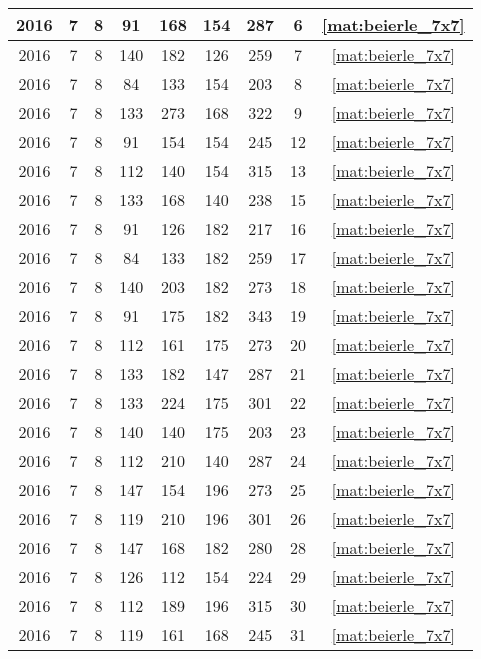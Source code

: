 \begin{longtable}{|c|c|c|c|c|c|c|c|c|}
2016 & 7 & 8 & 91 & 168 & 154 & 287 & 6 & \eqref{mat:beierle_7x7} \\ \hline 
2016 & 7 & 8 & 140 & 182 & 126 & 259 & 7 & \eqref{mat:beierle_7x7} \\ \hline 
2016 & 7 & 8 & 84 & 133 & 154 & 203 & 8 & \eqref{mat:beierle_7x7} \\ \hline 
2016 & 7 & 8 & 133 & 273 & 168 & 322 & 9 & \eqref{mat:beierle_7x7} \\ \hline 
2016 & 7 & 8 & 91 & 154 & 154 & 245 & 12 & \eqref{mat:beierle_7x7} \\ \hline 
2016 & 7 & 8 & 112 & 140 & 154 & 315 & 13 & \eqref{mat:beierle_7x7} \\ \hline 
2016 & 7 & 8 & 133 & 168 & 140 & 238 & 15 & \eqref{mat:beierle_7x7} \\ \hline 
2016 & 7 & 8 & 91 & 126 & 182 & 217 & 16 & \eqref{mat:beierle_7x7} \\ \hline 
2016 & 7 & 8 & 84 & 133 & 182 & 259 & 17 & \eqref{mat:beierle_7x7} \\ \hline 
2016 & 7 & 8 & 140 & 203 & 182 & 273 & 18 & \eqref{mat:beierle_7x7} \\ \hline 
2016 & 7 & 8 & 91 & 175 & 182 & 343 & 19 & \eqref{mat:beierle_7x7} \\ \hline 
2016 & 7 & 8 & 112 & 161 & 175 & 273 & 20 & \eqref{mat:beierle_7x7} \\ \hline 
2016 & 7 & 8 & 133 & 182 & 147 & 287 & 21 & \eqref{mat:beierle_7x7} \\ \hline 
2016 & 7 & 8 & 133 & 224 & 175 & 301 & 22 & \eqref{mat:beierle_7x7} \\ \hline 
2016 & 7 & 8 & 140 & 140 & 175 & 203 & 23 & \eqref{mat:beierle_7x7} \\ \hline 
2016 & 7 & 8 & 112 & 210 & 140 & 287 & 24 & \eqref{mat:beierle_7x7} \\ \hline 
2016 & 7 & 8 & 147 & 154 & 196 & 273 & 25 & \eqref{mat:beierle_7x7} \\ \hline 
2016 & 7 & 8 & 119 & 210 & 196 & 301 & 26 & \eqref{mat:beierle_7x7} \\ \hline 
2016 & 7 & 8 & 147 & 168 & 182 & 280 & 28 & \eqref{mat:beierle_7x7} \\ \hline 
2016 & 7 & 8 & 126 & 112 & 154 & 224 & 29 & \eqref{mat:beierle_7x7} \\ \hline 
2016 & 7 & 8 & 112 & 189 & 196 & 315 & 30 & \eqref{mat:beierle_7x7} \\ \hline 
2016 & 7 & 8 & 119 & 161 & 168 & 245 & 31 & \eqref{mat:beierle_7x7} \\ \hline 

\end{longtable}

